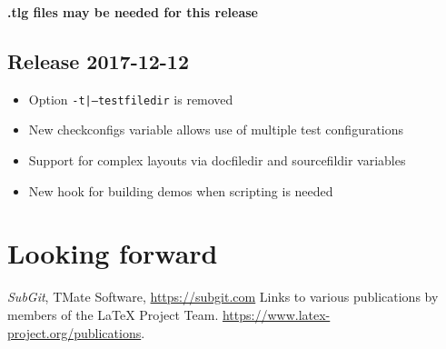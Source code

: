 \documentclass{ltnews}
\begin{document}
\textbf{.tlg files may be needed for this release}

\subsection{Release 2017-12-12}

\begin{itemize}
\item Option \texttt{-t|--testfiledir} is removed
\item New checkconfigs variable allows use of multiple test
  configurations
\item Support for complex layouts via docfiledir and sourcefildir
  variables
\item New hook for building demos when scripting is needed
\end{itemize}


\section{Looking forward}


\begin{thebibliography}{10}
  \raggedright
    \emph{SubGit}, TMate Software, \url{https://subgit.com}
    Links to various publications by members of the \LaTeX{} Project Team.
    \newblock \url{https://www.latex-project.org/publications}.
\end{thebibliography}
\end{document}
